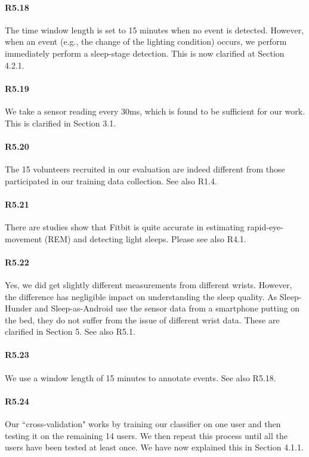 \paragraph{R5.18} The time window length is set to 15 minutes when no event is detected. However, when an event (e.g., the change of the
lighting condition) occurs, we perform immediately perform a sleep-stage detection. This is now clarified at Section 4.2.1.

\paragraph{R5.19} We take a sensor reading every 30ms, which is found to be sufficient for our work. This is clarified in Section 3.1.

\paragraph{R5.20} The 15 volunteers recruited in our evaluation are indeed different from those participated in our training data collection. See also R1.4.

\paragraph{R5.21} There are studies show that Fitbit is quite accurate in estimating rapid-eye-movement (REM) and detecting light sleeps. Please see also R4.1.

\paragraph{R5.22} Yes, we did get slightly different measurements from different wrists. However, the difference has negligible impact on
understanding the sleep quality. As Sleep-Hunder and Sleep-as-Android use the sensor data from a smartphone putting on the bed, they do not
suffer from the issue of different wrist data. These are clarified in Section 5. See also R5.1.


\paragraph{R5.23} We use a window length of 15 minutes to annotate events. See also R5.18.

\paragraph{R5.24} Our ``cross-validation" works by training our classifier on one user and then testing it on the remaining 14 users. We then repeat this process until all the users have been tested at least once. We have now explained this in Section 4.1.1.


